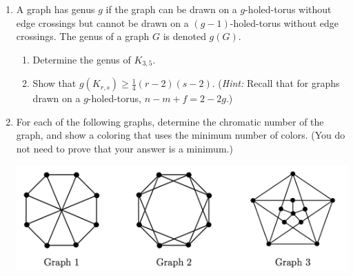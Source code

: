 \documentclass{article}
\begin{document}
\begin{enumerate}
\item A graph has genus $g$ if the graph can be drawn on a $g$-holed-torus without edge crossings but cannot be drawn on a $(g-1)$-holed-torus without edge crossings. The genus of a graph $G$ is denoted $g(G)$.

\begin{enumerate}
	\item  Determine the genus of $K_{3,5}$.
	\item Show that $g(K_{r,s}) \geqslant \frac 1 4 (r - 2)(s - 2)$. ({\it Hint:} Recall that for graphs drawn on a $g$-holed-torus, $n-m+f = 2 -2g$.)
\end{enumerate}

\pagebreak

\item For each of the following graphs, determine the chromatic number of the graph, and show a coloring that uses the minimum number of colors. (You do not need to prove that your answer is a minimum.)
\begin{center}
\includegraphics[width=.8\textwidth]{pic2.png}	
\end{center}


\end{enumerate}
\end{document}

